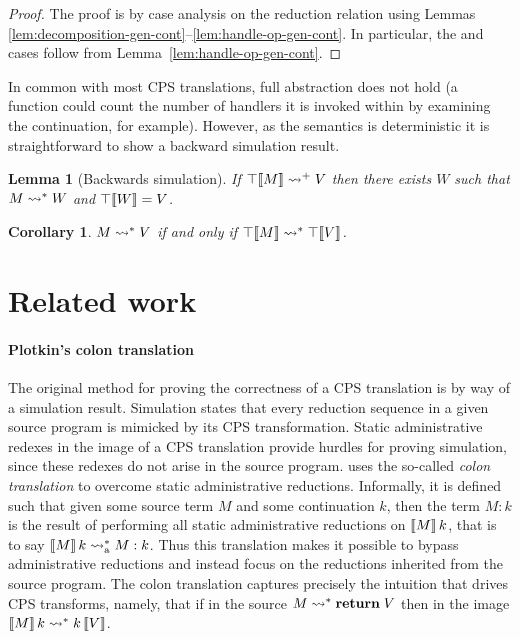 \documentclass[12pt,phd,lfcs,twoside,openright,logo,leftchapter,normalheadings]{infthesis}
\theoremstyle{plain}
\newtheorem{lemma}[theorem]{Lemma}
\newtheorem{corollary}[theorem]{Corollary}
\theoremstyle{definition}
\begin{document}
\begin{proof}
  The proof is by case analysis on the reduction relation using Lemmas
  \ref{lem:decomposition-gen-cont}--\ref{lem:handle-op-gen-cont}. In
  particular, the  and  cases follow
  from Lemma~\ref{lem:handle-op-gen-cont}.
\end{proof}

In common with most CPS translations, full abstraction does not hold
(a function could count the number of handlers it is invoked within by
examining the continuation, for example). However, as the semantics is
deterministic it is straightforward to show a backward simulation
result.
%
\begin{lemma}[Backwards simulation]
  If $\top\llbracket M \rrbracket \leadsto^+ V$ then there exists $W$
  such that $M \leadsto^* W$ and $\top\llbracket W \rrbracket = V$.
\end{lemma}
%
\begin{corollary}
$M \leadsto^\ast V$ if and only if $\top\llbracket M \rrbracket \leadsto^\ast \top\llbracket V \rrbracket$.
\end{corollary}

\section{Related work}
\label{sec:cps-related-work}

\paragraph{Plotkin's colon translation}

The original method for proving the correctness of a CPS
translation is by way of a simulation result. Simulation states that
every reduction sequence in a given source program is mimicked by its
CPS transformation.
%
Static administrative redexes in the image of a CPS translation
provide hurdles for proving simulation, since these redexes do not
arise in the source program.
%
\citet{Plotkin75} uses the so-called \emph{colon translation} to
overcome static administrative reductions.
%
Informally, it is defined such that given some source term $M$ and
some continuation $k$, then the term $M : k$ is the result of
performing all static administrative reductions on $\llbracket M \rrbracket\,k$, that
is to say $\llbracket M \rrbracket\,k \leadsto_{\textrm{a}}^* M : k$.
%
Thus this translation makes it possible to bypass administrative
reductions and instead focus on the reductions inherited from the
source program.
%
The colon translation captures precisely the intuition that drives CPS
transforms, namely, that if in the source $M \leadsto^\ast \mathbf{return}\;V$
then in the image $\llbracket M \rrbracket\,k \leadsto^\ast k\,\llbracket V \rrbracket$.
\end{document}

